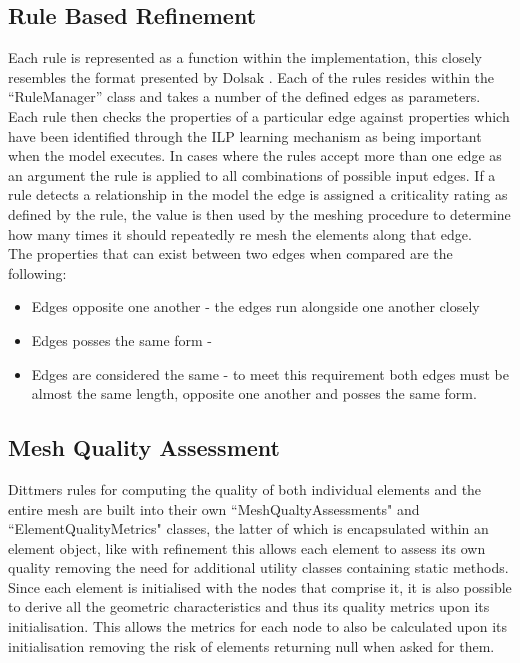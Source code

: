 \subsection{Rule Based Refinement}
Each rule is represented as a function within the implementation, this closely resembles the format presented by Dolsak \cite{DolsakPaper91, DolsakPaper94, appOfILPToFEMeshDesign} \cite{ConsultRuleIntelltSystemFE}. Each of the rules resides within the ``RuleManager'' class and takes a number of the defined edges as parameters. Each rule then checks the properties of a particular edge against properties which have been identified through the ILP learning mechanism as being important when the model executes. In cases where the rules accept more than one edge as an argument the rule is applied to all combinations of possible input edges. If a rule detects a relationship in the model the edge is assigned a criticality rating as defined by the rule, the value is then used by the meshing procedure to determine how many times it should repeatedly re mesh the elements along that edge. \\ 
 
The properties that can exist between two edges when compared are the following:
\begin{itemize}
\item Edges opposite one another - the edges run alongside one another closely
\item Edges posses the same form - 

\item Edges are considered the same - to meet this requirement both edges must be almost the same length, opposite one another and posses the same form.

\end{itemize}


\subsection{Mesh Quality Assessment}
Dittmers rules for computing the quality of both individual elements and the entire mesh are built into their own ``MeshQualtyAssessments" and ``ElementQualityMetrics" classes, the latter of which is encapsulated within an element object, like with refinement this allows each element to assess its own quality removing the need for additional utility classes containing static methods. \\

Since each element is initialised with the nodes that comprise it, it is also possible to derive all the geometric characteristics and thus its quality metrics upon its initialisation. This allows the metrics for each node to also be calculated upon its initialisation removing the risk of elements returning null when asked for them.

